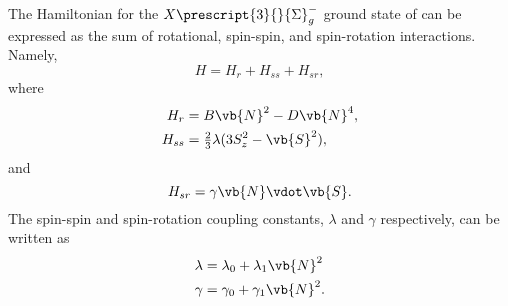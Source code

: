 \documentclass[11pt, twoside, fleqn]{report}
\newcommand{\state}[2]{\prescript{#1}{}{#2}}
\begin{document}
The Hamiltonian for the $X\state{3}{\Sigma}_g^{-}$ ground state of  can be expressed as the sum of rotational, spin-spin, and spin-rotation interactions. Namely, \cite{amiotMagneticDipole1Dg1981}
\begin{equation*}
    H = H_r + H_{ss} + H_{sr},
\end{equation*}
where
\begin{align*}
    H_r  & = B\vb{N}^2 - D\vb{N}^4,                    \\
    H_{ss} & = \tfrac{2}{3}\lambda(3S_z^2 - \vb{S}^2),
\end{align*}
and
\begin{equation*}
    H_{sr} = \gamma\vb{N}\vdot\vb{S}.
\end{equation*}
The spin-spin and spin-rotation coupling constants, $\lambda$ and $\gamma$ respectively, can be written as
\begin{align*}
    \lambda & = \lambda_0 + \lambda_1\vb{N}^2 \\
    \gamma  & = \gamma_0 + \gamma_1\vb{N}^2.
\end{align*}
\end{document}
